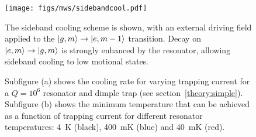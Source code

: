 \begin{figure}[ht]
  \centering
  \texttt{[image: figs/mws/sidebandcool.pdf]}
  \caption[Sideband cooling scheme]{
    The sideband cooling scheme is shown, with an external driving field
    applied to the $\ket{g, m}\rightarrow\ket{e, m-1}$ transition. Decay on
    $\ket{e,m}\rightarrow\ket{g,m}$ is strongly enhanced by the resonator,
    allowing sideband cooling to low motional states.
  }
  \label{mws:fig:sideband}
\end{figure}


\begin{figure}[htb]
  \centering
  \begin{subfigure}[b]{0.44\textwidth}
  \end{subfigure}
  \hspace{1cm}
  \begin{subfigure}[b]{0.44\textwidth}
  \end{subfigure}
  \caption[Calculated sideband cooling rates]{
    Subfigure (a) shows the cooling rate for varying trapping current for a
    $Q=10^6$ resonator and dimple trap (see section~\ref{theory:simple}).
    Subfigure (b) shows the minimum temperature that can be achieved as a
    function of trapping current for different resonator temperatures:
    \SI{4}{\kelvin} (black), \SI{400}{\milli\kelvin} (blue) and
    \SI{40}{\milli\kelvin} (red).
    }
    \label{mws:fig:sbtemps}
\end{figure}

